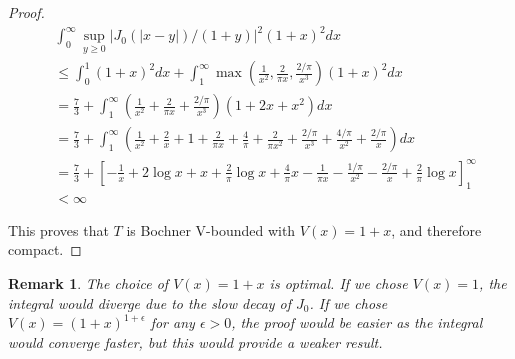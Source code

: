 \documentclass{article}
\newtheorem{remark}[theorem]{Remark}
\begin{document}
\begin{proof}
\begin{align*}
&\int_0^\infty \sup_{y\geq0} |J_0(|x-y|)/(1+y)|^2 (1+x)^2 dx \\
&\leq \int_0^1 (1+x)^2 dx + \int_1^\infty \max\left(\frac{1}{x^2}, \frac{2}{\pi x}, \frac{2/\pi}{x^3}\right) (1+x)^2 dx \\
&= \frac{7}{3} + \int_1^\infty \left(\frac{1}{x^2} + \frac{2}{\pi x} + \frac{2/\pi}{x^3}\right) (1+2x+x^2) dx \\
&= \frac{7}{3} + \int_1^\infty \left(\frac{1}{x^2} + \frac{2}{x} + 1 + \frac{2}{\pi x} + \frac{4}{\pi} + \frac{2}{\pi x^2} + \frac{2/\pi}{x^3} + \frac{4/\pi}{x^2} + \frac{2/\pi}{x}\right) dx \\
&= \frac{7}{3} + \left[-\frac{1}{x} + 2\log x + x + \frac{2}{\pi}\log x + \frac{4}{\pi}x - \frac{1}{\pi x} - \frac{1/\pi}{x^2} - \frac{2/\pi}{x} + \frac{2}{\pi}\log x\right]_1^\infty \\
&< \infty
\end{align*}

This proves that $T$ is Bochner V-bounded with $V(x) = 1 + x$, and therefore compact.
\end{proof}

\begin{remark}
The choice of $V(x) = 1 + x$ is optimal. If we chose $V(x) = 1$, the integral would diverge due to the slow decay of $J_0$. If we chose $V(x) = (1+x)^{1+\epsilon}$ for any $\epsilon > 0$, the proof would be easier as the integral would converge faster, but this would provide a weaker result.
\end{remark}
\end{document}
